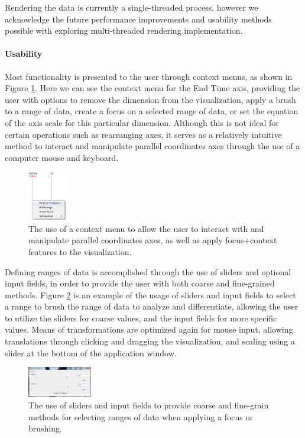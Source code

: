 \documentclass[journal]{vgtc}                %
\begin{document}
Rendering the data is currently a single-threaded process, however we acknowledge the future performance improvements and usability methods possible with exploring multi-threaded rendering implementation.

\paragraph{Usability}
Most functionality is presented to the user through context menus, as shown in Figure \ref{fig:context_menus}. Here we can see the context menu for the End Time axis, providing the user with options to remove the dimension from the visualization, apply a brush to a range of data, create a focus on a selected range of data, or set the equation of the axis scale for this particular dimension. Although this is not ideal for certain operations such as rearranging axes, it serves as a relatively intuitive method to interact and manipulate parallel coordinates axes through the use of a computer mouse and keyboard.

\begin{figure}[h!]
 \centering
 \includegraphics[width=0.15\textwidth]{images/context_menu.eps}
 \caption[Context menus to interact with and manipulate axes.]{The use of a context menu to allow the user to interact with and manipulate parallel coordinates axes, as well as apply focus+context features to the visualization.}
 \label{fig:context_menus}
\end{figure}

Defining ranges of data is accomplished through the use of sliders and optional input fields, in order to provide the user with both coarse and fine-grained methods. Figure \ref{fig:sliders_input} is an example of the usage of sliders and input fields to select a range to brush the range of data to analyze and differentiate, allowing the user to utilize the sliders for coarse values, and the input fields for more specific values. Means of transformations are optimized again for mouse input, allowing translations through clicking and dragging the visualization, and scaling using a slider at the bottom of the application window.

\begin{figure}[h!]
 \centering
 \includegraphics[width=0.25\textwidth]{images/select_range.eps}
 \caption[Sliders and input fields for specifying ranges of data.]{The use of sliders and input fields to provide coarse and fine-grain methods for selecting ranges of data when applying a focus or brushing.}
 \label{fig:sliders_input}
\end{figure}
\end{document}
